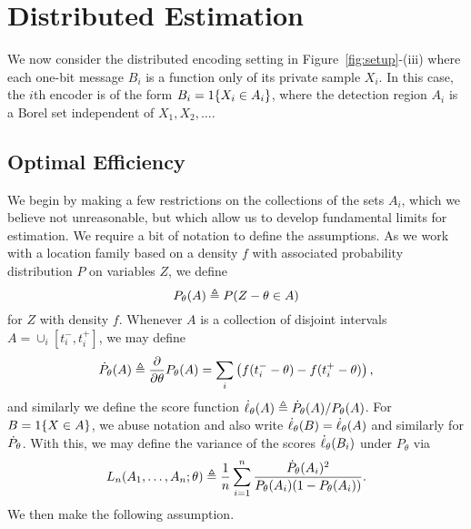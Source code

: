 \section{Distributed Estimation \label{sec:distributed}}

We now consider the distributed encoding setting in
Figure~\ref{fig:setup}-(iii) where each one-bit message $B_i$ is a
function only of its private sample $X_i$. In this case, the $i$th encoder is
of the form $B_i = 1\!\left\{X_i \in A_i\right\}$, where the detection region
$A_i$ is a Borel set independent of $X_1, X_2, \ldots$.

\subsection{Optimal Efficiency}
We begin by making a few restrictions on the collections of the sets $A_i$,
which we believe not unreasonable, but which allow us to develop fundamental
limits for estimation. We require a bit of notation to define the
assumptions. As we work with a location family based on a density $f$
with associated probability distribution $P$ on variables $Z$,
we define
\begin{equation*}
  P_\theta(A) \triangleq P(Z - \theta \in A)
\end{equation*}
for $Z$ with density $f$. Whenever $A$ is a collection of disjoint intervals $A = \cup_i [t_i^-, t_i^+]$, we may define
\begin{equation*}
  \dot{P}_\theta(A) \triangleq \frac{\partial}{\partial \theta} P_\theta(A)
  = \sum_i \left(f(t_i^- - \theta) - f(t_i^+ - \theta)\right),
\end{equation*}
and similarly we define the score
function $\dot{\ell}_\theta(A) \triangleq \dot{P}_\theta(A) / P_\theta(A)$.
For $B = 1\!\left\{X \in A\right\}$, we abuse notation and also write
$\dot{\ell}_\theta(B) = \dot{\ell}_\theta(A)$ and similarly for $\dot{P}_\theta$.
With this, we may define the variance of the
scores $\dot{\ell}_\theta(B_i)$ under $P_\theta$ via
\begin{equation}
  \label{eq:precision_general}
  L_n(A_1,\ldots,A_n;\theta) \triangleq
  \frac{1}{n} \sum_{i=1}^n \frac{ \dot{P}_\theta(A_i)^2}{
    P_\theta(A_i) (1 - P_\theta(A_i))}.
\end{equation}
We then make the following assumption.
